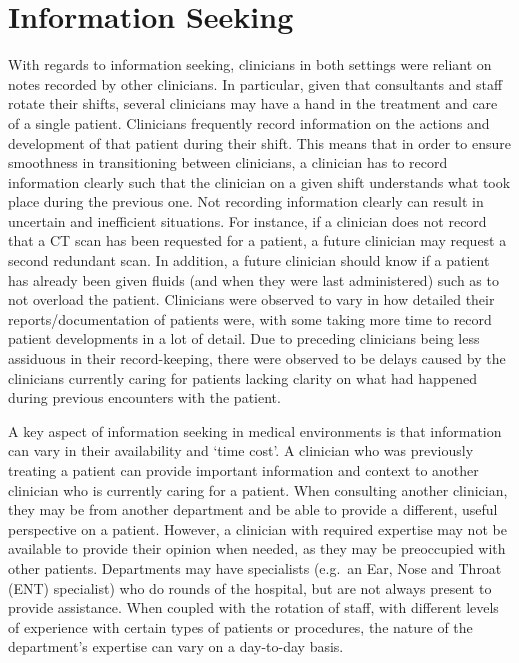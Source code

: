 \documentclass[a4paper, nobind]{templates/ociamthesis}
\begin{document}
\section{Information Seeking}\label{information-seeking-1}

With regards to information seeking, clinicians in both settings were reliant on notes recorded by other clinicians. In particular, given that consultants and staff rotate their shifts, several clinicians may have a hand in the treatment and care of a single patient. Clinicians frequently record information on the actions and development of that patient during their shift. This means that in order to ensure smoothness in transitioning between clinicians, a clinician has to record information clearly such that the clinician on a given shift understands what took place during the previous one. Not recording information clearly can result in uncertain and inefficient situations. For instance, if a clinician does not record that a CT scan has been requested for a patient, a future clinician may request a second redundant scan. In addition, a future clinician should know if a patient has already been given fluids (and when they were last administered) such as to not overload the patient. Clinicians were observed to vary in how detailed their reports/documentation of patients were, with some taking more time to record patient developments in a lot of detail. Due to preceding clinicians being less assiduous in their record-keeping, there were observed to be delays caused by the clinicians currently caring for patients lacking clarity on what had happened during previous encounters with the patient.

\hfill\break
A key aspect of information seeking in medical environments is that information can vary in their availability and `time cost'. A clinician who was previously treating a patient can provide important information and context to another clinician who is currently caring for a patient. When consulting another clinician, they may be from another department and be able to provide a different, useful perspective on a patient. However, a clinician with required expertise may not be available to provide their opinion when needed, as they may be preoccupied with other patients. Departments may have specialists (e.g.~an Ear, Nose and Throat (ENT) specialist) who do rounds of the hospital, but are not always present to provide assistance. When coupled with the rotation of staff, with different levels of experience with certain types of patients or procedures, the nature of the department's expertise can vary on a day-to-day basis.
\end{document}
